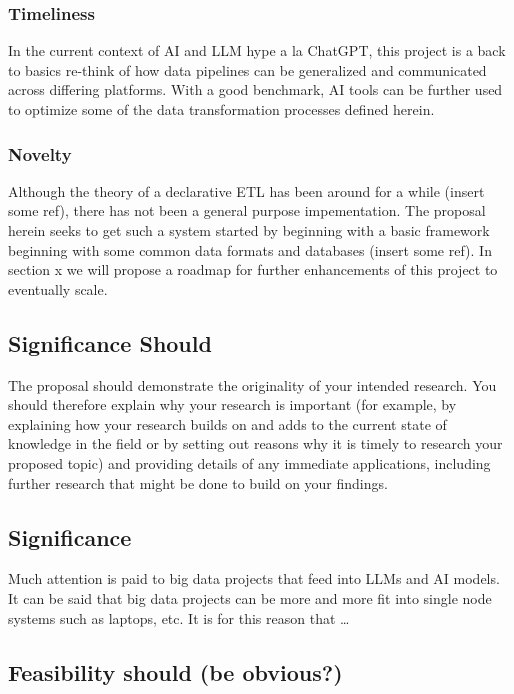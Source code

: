 \subsubsection{Timeliness}\label{timeliness}

In the current context of AI and LLM hype a la ChatGPT, this project is
a back to basics re-think of how data pipelines can be generalized and
communicated across differing platforms. With a good benchmark, AI tools
can be further used to optimize some of the data transformation
processes defined herein.

\subsubsection{Novelty}\label{novelty}

Although the theory of a declarative ETL has been around for a while
(insert some ref), there has not been a general purpose impementation.
The proposal herein seeks to get such a system started by beginning with
a basic framework beginning with some common data formats and databases
(insert some ref). In section x we will propose a roadmap for further
enhancements of this project to eventually scale.

\subsection{Significance Should}\label{significance-should}

The proposal should demonstrate the originality of your intended
research. You should therefore explain why your research is important
(for example, by explaining how your research builds on and adds to the
current state of knowledge in the field or by setting out reasons why it
is timely to research your proposed topic) and providing details of any
immediate applications, including further research that might be done to
build on your findings.

\subsection{Significance}\label{significance}

Much attention is paid to big data projects that feed into LLMs and AI
models. It can be said that big data projects can be more and more fit
into single node systems such as laptops, etc. It is for this reason
that \ldots{}

\subsection{Feasibility should (be
obvious?)}\label{feasibility-should-be-obvious}

